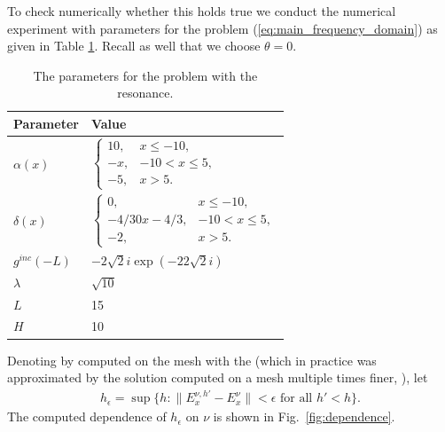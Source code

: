 To check numerically whether this holds true we conduct the  numerical experiment with parameters for the problem (\ref{eq:main_frequency_domain}) as given in Table \ref{tab:parameters}. 
Recall as well that we choose $\theta=0$. 

\begin{table}[htb!]
\begin{tabular}{l|l}
Parameter & Value \\
\hline
$\alpha(x)$ & $\left\{\begin{array}{lr}
10, & x\leq -10,\\
-x, & -10<x\leq 5,\\
-5, & x>5.
\end{array}\right.$ \\
$\delta(x)$ & 
$\left\{\begin{array}{lr}
0, & x\leq -10,\\
-4/30x-4/3,& -10<x\leq 5,\\
-2, & x>5.
\end{array}\right.$ \\
$g^{inc}(-L)$ & $-2 \sqrt{2}i\exp(-22\sqrt{2}i)$\\
$\lambda$ & 
$\sqrt{10}$\\
$L$& 15\\
$H$ & 10 \\
\end{tabular}
\caption{The parameters for the problem with the resonance.}
\label{tab:parameters}
\end{table}
Denoting by  computed on the mesh with the  (which in practice was approximated by the solution computed on a mesh multiple times finer, ), let 
\begin{align}
\label{eq:def_epsilon}
h_{\epsilon}=\sup\{h: \|E_{x}^{\nu,h'}-E_{x}^{\nu}\|<\epsilon \text{ for all } h'<h\}.
\end{align}
The computed dependence of $h_{\epsilon}$ on $\nu$ is shown in Fig.~\ref{fig:dependence}.

